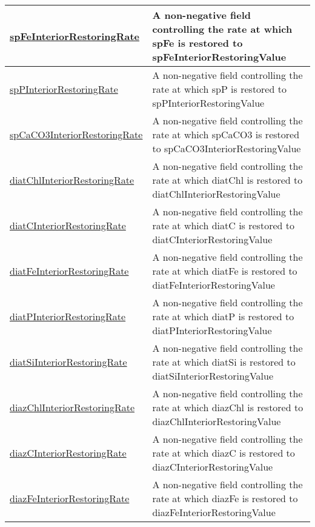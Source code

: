 {\begin{center}
\begin{longtable}{| p{2.0in} | p{4.0in} |}
    \hline
    \hyperref[subsec:var_sec_forcing_spFeInteriorRestoringRate]{spFeInteriorRestoringRate} & A non-negative field controlling the rate at which spFe is restored to spFeInteriorRestoringValue \\
    \hline
    \hyperref[subsec:var_sec_forcing_spPInteriorRestoringRate]{spPInteriorRestoringRate} & A non-negative field controlling the rate at which spP is restored to spPInteriorRestoringValue \\
    \hline
    \hyperref[subsec:var_sec_forcing_spCaCO3InteriorRestoringRate]{spCaCO3InteriorRestoringRate} & A non-negative field controlling the rate at which spCaCO3 is restored to spCaCO3InteriorRestoringValue \\
    \hline
    \hyperref[subsec:var_sec_forcing_diatChlInteriorRestoringRate]{diatChlInteriorRestoringRate} & A non-negative field controlling the rate at which diatChl is restored to diatChlInteriorRestoringValue \\
    \hline
    \hyperref[subsec:var_sec_forcing_diatCInteriorRestoringRate]{diatCInteriorRestoringRate} & A non-negative field controlling the rate at which diatC is restored to diatCInteriorRestoringValue \\
    \hline
    \hyperref[subsec:var_sec_forcing_diatFeInteriorRestoringRate]{diatFeInteriorRestoringRate} & A non-negative field controlling the rate at which diatFe is restored to diatFeInteriorRestoringValue \\
    \hline
    \hyperref[subsec:var_sec_forcing_diatPInteriorRestoringRate]{diatPInteriorRestoringRate} & A non-negative field controlling the rate at which diatP is restored to diatPInteriorRestoringValue \\
    \hline
    \hyperref[subsec:var_sec_forcing_diatSiInteriorRestoringRate]{diatSiInteriorRestoringRate} & A non-negative field controlling the rate at which diatSi is restored to diatSiInteriorRestoringValue \\
    \hline
    \hyperref[subsec:var_sec_forcing_diazChlInteriorRestoringRate]{diazChlInteriorRestoringRate} & A non-negative field controlling the rate at which diazChl is restored to diazChlInteriorRestoringValue \\
    \hline
    \hyperref[subsec:var_sec_forcing_diazCInteriorRestoringRate]{diazCInteriorRestoringRate} & A non-negative field controlling the rate at which diazC is restored to diazCInteriorRestoringValue \\
    \hline
    \hyperref[subsec:var_sec_forcing_diazFeInteriorRestoringRate]{diazFeInteriorRestoringRate} & A non-negative field controlling the rate at which diazFe is restored to diazFeInteriorRestoringValue \\

\end{longtable}
\end{center}}
